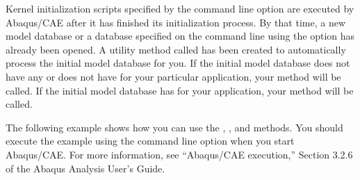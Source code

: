 \documentclass[letterpaper,10pt,english]{sphinxmanual}
\begin{document}
Kernel initialization scripts specified by the  command line option are executed by Abaqus/CAE after it has finished its initialization process. By that time, a new model database or a database specified on the command line using the  option has already been opened. A utility method called  has been created to automatically process the initial model database for you. If the initial model database does not have any  or does not have  for your particular application, your  method will be called. If the initial model database has  for your application, your  method will be called.

The following example shows how you can use the , , and  methods. You should execute the example using the  command line option when you start Abaqus/CAE. For more information, see “Abaqus/CAE execution,” Section 3.2.6 of the Abaqus Analysis User’s Guide.
\end{document}
